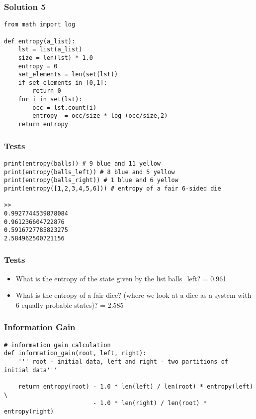 \begin{frame}[fragile]\frametitle{Solution 5}	
\begin{lstlisting}
from math import log
    
def entropy(a_list):
    lst = list(a_list)
    size = len(lst) * 1.0
    entropy = 0
    set_elements = len(set(lst))
    if set_elements in [0,1]:
        return 0
    for i in set(lst):
        occ = lst.count(i)
        entropy -= occ/size * log (occ/size,2)
    return entropy
\end{lstlisting}

\end{frame}

\begin{frame}[fragile]\frametitle{Tests}	

\begin{lstlisting}
print(entropy(balls)) # 9 blue and 11 yellow
print(entropy(balls_left)) # 8 blue and 5 yellow
print(entropy(balls_right)) # 1 blue and 6 yellow
print(entropy([1,2,3,4,5,6])) # entropy of a fair 6-sided die

>>
0.9927744539878084
0.961236604722876
0.5916727785823275
2.584962500721156
\end{lstlisting}

 \end{frame}
 
\begin{frame}[fragile]\frametitle{Tests}	
\begin{itemize}
\item What is the entropy of the state given by the list balls\_left? = 0.961
\item What is the entropy of a fair dice? (where we look at a dice as a system with 6 equally probable states)?  = 2.585
\end{itemize}

 \end{frame}

\begin{frame}[fragile]\frametitle{Information Gain}	
\begin{lstlisting}
# information gain calculation
def information_gain(root, left, right):
    ''' root - initial data, left and right - two partitions of initial data'''
        
    return entropy(root) - 1.0 * len(left) / len(root) * entropy(left) \
                         - 1.0 * len(right) / len(root) * entropy(right) 
						 


\end{lstlisting}

\end{frame}

